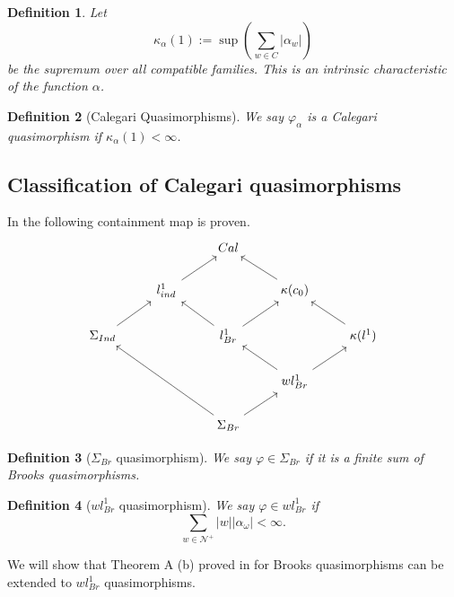 \documentclass[leqno]{article}
\newtheorem*{definition}{Definition}
\begin{document}
\begin{definition} Let
  \[
  \kappa_\alpha (1):= \sup \left( \sum_{w\in C} |\alpha _w| \right) 
  \] 
  be the supremum over all compatible families. This is an intrinsic characteristic of the function $\alpha$.
\end{definition}

\begin{definition}[Calegari Quasimorphisms] We say $\varphi _\alpha $ is a Calegari quasimorphism if $\kappa_{\alpha }(1) < \infty$.
\end{definition}

\subsection{Classification of Calegari quasimorphisms}
In \cite{fournier}  the following containment map is proven.
\[\begin{tikzcd}
	&& Cal \\
	& {l^1_{ind}} && {\kappa(c_0)} \\
	{\Sigma_{Ind}} && {l^1_{Br}} && {\kappa(l^1)} \\
	&&& {wl^1_{Br}} \\
	&& {\Sigma_{Br}}
	\arrow[from=5-3, to=3-1]
	\arrow[from=5-3, to=4-4]
	\arrow[from=4-4, to=3-5]
	\arrow[from=4-4, to=3-3]
	\arrow[from=3-5, to=2-4]
	\arrow[from=3-3, to=2-4]
	\arrow[from=2-4, to=1-3]
	\arrow[from=3-1, to=2-2]
	\arrow[from=2-2, to=1-3]
	\arrow[from=3-3, to=2-2]
\end{tikzcd}\]

\begin{definition}[$ \Sigma _{Br}$ quasimorphism] We say  $\varphi \in \Sigma _{Br}$ if it is a finite sum of Brooks quasimorphisms.
\end{definition}

\begin{definition}[$wl^1_{Br}$ quasimorphism] We say  $\varphi \in wl^1_{Br}$ if
  \[
\sum_{w\in \mathcal{N}^+}  |w||\alpha _\omega |<\infty .
  \] 
\end{definition}

We will show that Theorem A (b) proved in \cite{amontova} for Brooks quasimorphisms can be extended to $wl^1_{Br}$ quasimorphisms.
\end{document}
